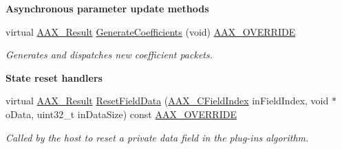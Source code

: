 \begin{Indent}{\bf Asynchronous parameter update methods}
\begin{DoxyCompactItemize}
virtual \hyperlink{a00149_a4d8f69a697df7f70c3a8e9b8ee130d2f}{A\+A\+X\+\_\+\+Result} \hyperlink{a00018_a7f85327b464a4a7f9b66155f37961bf3}{Generate\+Coefficients} (void) \hyperlink{a00149_ac2f24a5172689ae684344abdcce55463}{A\+A\+X\+\_\+\+O\+V\+E\+R\+R\+I\+D\+E}
\begin{DoxyCompactList}\small\item\em Generates and dispatches new coefficient packets. \end{DoxyCompactList}\end{DoxyCompactItemize}
\end{Indent}
\begin{Indent}{\bf State reset handlers}\par
\begin{DoxyCompactItemize}
\item 
virtual \hyperlink{a00149_a4d8f69a697df7f70c3a8e9b8ee130d2f}{A\+A\+X\+\_\+\+Result} \hyperlink{a00018_accef965824c9b158cafb65e59e216b6a}{Reset\+Field\+Data} (\hyperlink{a00149_ae807f8986143820cfb5d6da32165c9c7}{A\+A\+X\+\_\+\+C\+Field\+Index} in\+Field\+Index, void $\ast$o\+Data, uint32\+\_\+t in\+Data\+Size) const \hyperlink{a00149_ac2f24a5172689ae684344abdcce55463}{A\+A\+X\+\_\+\+O\+V\+E\+R\+R\+I\+D\+E}
\begin{DoxyCompactList}\small\item\em Called by the host to reset a private data field in the plug-\/in\textquotesingle{}s algorithm. \end{DoxyCompactList}\end{DoxyCompactItemize}
\end{Indent}
